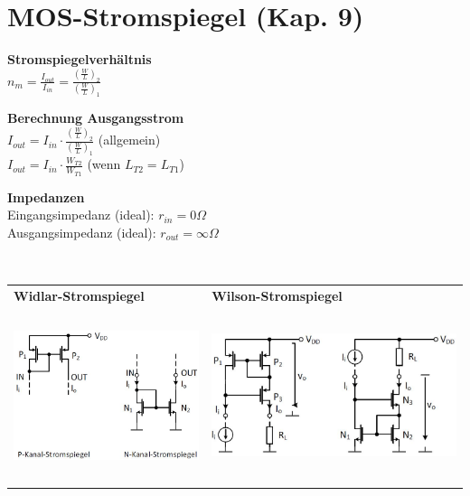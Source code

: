 
\section{MOS-Stromspiegel (Kap. 9)}

\begin{minipage}[t]{0.25\textwidth}
	\textbf{Stromspiegelverhältnis}\\
	$n_m=\frac{I_{out}}{I_{in}}=\frac{(\frac{W}{L})_{2}}{(\frac{W}{L})_{1}}$
\end{minipage}
\begin{minipage}[t]{0.35\textwidth}
	\textbf{Berechnung Ausgangsstrom}\\
	$I_{out}=I_{in}\cdot\frac{(\frac{W}{L})_{2}}{(\frac{W}{L})_{1}}$ (allgemein)\\
	$I_{out}=I_{in}\cdot \frac{W_{T2}}{W_{T1}}$ (wenn $L_{T2}=L_{T1}$)
\end{minipage}
\begin{minipage}[t]{0.35\textwidth}
	\textbf{Impedanzen}\\
	Eingangsimpedanz (ideal): $r_{in}=0\Omega$\\
	Ausgangsimpedanz (ideal): $r_{out}=\infty\Omega$
\end{minipage}\\
\begin{tabular}{|p{}|p{}|}
	\hline
	\textbf{Widlar-Stromspiegel}&\textbf{Wilson-Stromspiegel}\\
	\includegraphics[height=5cm]{chapters/Stromspiegel/images/Widlar}&\includegraphics[height=5cm]{chapters/Stromspiegel/images/Wilson}\\ \hline
\end{tabular}\\
